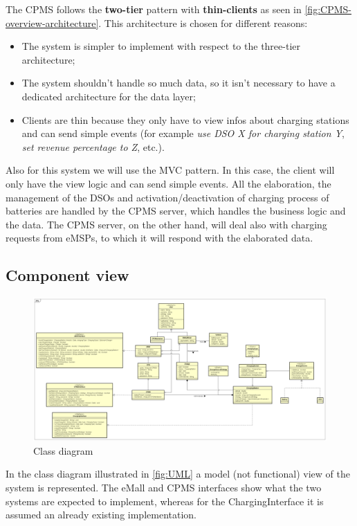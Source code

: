 The \ac{CPMS} follows the \textbf{two-tier} pattern with \textbf{thin-clients} as seen in \autoref{fig:CPMS-overview-architecture}. This architecture is chosen for different reasons:
\begin{itemize}
    \item The system is simpler to implement with respect to the three-tier architecture;
    \item The system shouldn't handle so much data, so it isn't necessary to have a dedicated architecture for the data layer;
    \item Clients are thin because they only have to view infos about charging stations and can send simple events (for example \textit{use \ac{DSO} X for charging station Y}, \textit{set revenue percentage to Z}, etc.).
\end{itemize}
Also for this system we will use the \ac{MVC} pattern. In this case, the client will only have the view logic and can send simple events. All the elaboration, the management of the \acp{DSO} and activation/deactivation of charging process of batteries are handled by the \ac{CPMS} server, which handles the business logic and the data.
The \ac{CPMS} server, on the other hand, will deal also with charging requests from \acp{eMSP}, to which it will respond with the elaborated data.


\subsection{Component view}
\begin{figure}[!h]
    \begin{center}
        \includegraphics[keepaspectratio, width=16cm]{UML.png}
        \caption{Class diagram}
        \label{fig:UML}
    \end{center}
\end{figure}
In the class diagram illustrated in \autoref{fig:UML} a model (not functional) view of the system is represented. The \ac{eMall} and \ac{CPMS} interfaces show what the two systems are expected to implement, whereas for the ChargingInterface it is assumed an already existing implementation.

